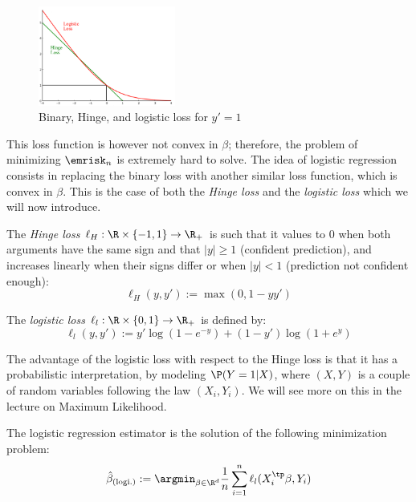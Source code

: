\documentclass[toc, titlepaged]{../cs-classes/cs-classes}
\begin{document}
\begin{figure}
\centering
    \captionsetup{justification=centering}
    \includegraphics[width=0.4\textwidth]{images/losses-graph.png}
    \caption{Binary, Hinge, and logistic loss for $y'=1$}
\end{figure}
This loss function is however not convex in $\beta$; therefore, the problem of minimizing $\emrisk_n$ is extremely hard to solve. 
The idea of logistic regression consists in replacing the binary loss with another similar loss function, which is convex in $\beta$. This is the case of both the \emph{Hinge loss} and the \emph{logistic loss} which we will now introduce.

\begin{definition}
    The \emph{Hinge loss} $\ell_H:\R\times\{-1, 1\}\to\R_+$ is such that it values to $0$ when both arguments have the same sign and that $|y|\geq1$ (confident prediction), and increases linearly when their signs differ or when $|y|<1$ (prediction not confident enough):
    \begin{equation}
        \ell_H(y, y') := \max(0, 1-yy')
    \end{equation}
\end{definition}

\begin{definition}
    The \emph{logistic loss} $\ell_l:\R\times\{0, 1\}\to\R_+$ is defined by:
    \begin{equation}
        \ell_l(y, y') := y'\log(1-e^{-y}) + (1-y')\log(1+e^y)
    \end{equation}
\end{definition}

The advantage of the logistic loss with respect to the Hinge loss is that it has a probabilistic interpretation, by modeling $\P(Y=1|X)$, where $(X, Y)$ is a couple of random variables following the law $(X_i, Y_i)$. We will see more on this in the lecture on Maximum Likelihood.

\begin{definition}
    The logistic regression estimator is the solution of the following minimization problem:
    \begin{equation}
        \hat{\beta}_{\textnormal{(logi.)}} := \argmin_{\beta\in\R^d}\frac{1}{n}\sum_{i=1}^n \ell_l(X^\tp_i\beta, Y_i)
    \end{equation}    
\end{definition}
\end{document}
